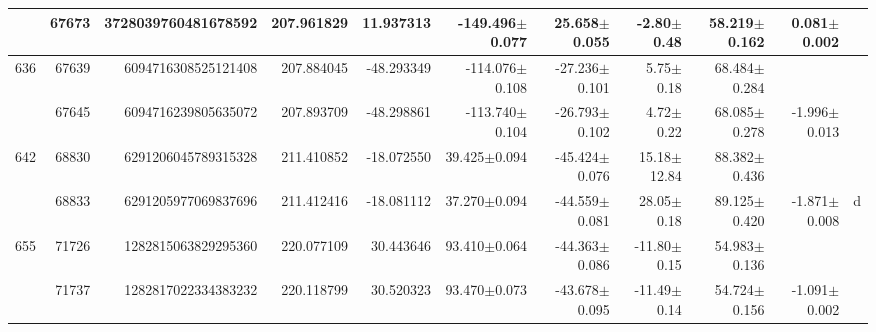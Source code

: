 \documentclass{ws-ijmpd}
\begin{document}
\begin{landscape}
\begin{longtable}{rrrrrrrrrrl}
            &   67673 &      3728039760481678592 &                   207.961829 &                    11.937313 &               -149.496$\pm$0.077 &                 25.658$\pm$0.055 &          -2.80$\pm$  0.48 &        58.219$\pm$0.162 &                           0.081$\pm$0.002 &                                                    \\
 \hline 636 &   67639 &      6094716308525121408 &                   207.884045 &                   -48.293349 &               -114.076$\pm$0.108 &                -27.236$\pm$0.101 &           5.75$\pm$  0.18 &        68.484$\pm$0.284 &                                           &                                                    \\
            &   67645 &      6094716239805635072 &                   207.893709 &                   -48.298861 &               -113.740$\pm$0.104 &                -26.793$\pm$0.102 &           4.72$\pm$  0.22 &        68.085$\pm$0.278 &                          -1.996$\pm$0.013 &                                                    \\
 \hline 642 &   68830 &      6291206045789315328 &                   211.410852 &                   -18.072550 &                 39.425$\pm$0.094 &                -45.424$\pm$0.076 &          15.18$\pm$ 12.84 &        88.382$\pm$0.436 &                                           &                                                    \\
            &   68833 &      6291205977069837696 &                   211.412416 &                   -18.081112 &                 37.270$\pm$0.094 &                -44.559$\pm$0.081 &          28.05$\pm$  0.18 &        89.125$\pm$0.420 &                          -1.871$\pm$0.008 &                                                  d \\
 \hline 655 &   71726 &      1282815063829295360 &                   220.077109 &                    30.443646 &                 93.410$\pm$0.064 &                -44.363$\pm$0.086 &         -11.80$\pm$  0.15 &        54.983$\pm$0.136 &                                           &                                                    \\
            &   71737 &      1282817022334383232 &                   220.118799 &                    30.520323 &                 93.470$\pm$0.073 &                -43.678$\pm$0.095 &         -11.49$\pm$  0.14 &        54.724$\pm$0.156 &                          -1.091$\pm$0.002 &                                                    \\

\end{longtable}
\end{landscape}
\end{document}
